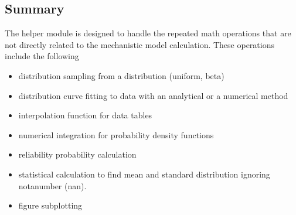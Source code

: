 \documentclass[letterpaper,10pt,english]{sphinxmanual}
\begin{document}
\subsection{Summary}
\label{\detokenize{helper_func:summary}}
\sphinxAtStartPar
The helper module is designed to handle the repeated math operations that are not directly related to the mechanistic model calculation. These operations include the following
\begin{itemize}
\item {} 
\sphinxAtStartPar
distribution sampling from a distribution (uniform, beta)

\item {} 
\sphinxAtStartPar
distribution curve fitting to data with an analytical or a numerical method

\item {} 
\sphinxAtStartPar
interpolation function for data tables

\item {} 
\sphinxAtStartPar
numerical integration for probability density functions

\item {} 
\sphinxAtStartPar
reliability probability calculation

\item {} 
\sphinxAtStartPar
statistical calculation to find mean and standard distribution ignoring not\sphinxhyphen{}a\sphinxhyphen{}number (nan).

\item {} 
\sphinxAtStartPar
figure sub\sphinxhyphen{}plotting

\end{itemize}
\end{document}

